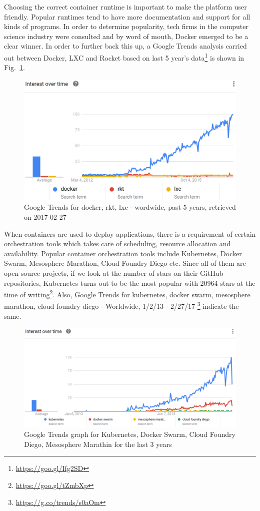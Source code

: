 \documentclass[DD]{iitmdiss}
\begin{document}
Choosing the correct container runtime is important to make the platform user friendly. Popular runtimes tend to have more documentation and support for all kinds of programs. In order to determine popularity, tech firms in the computer science industry were consulted and by word of mouth, Docker emerged to be a clear winner. In order to further back this up, a Google Trends analysis carried out between Docker, LXC and Rocket based on last 5 year's data\footnote{\url{https://goo.gl/Ifg2SD}} is shown in Fig.~\ref{fig:google_trends_docker_rkt_lxc}. 

\begin{figure}[h]
\centering
\includegraphics[width=0.9\linewidth]{img/google_trends_docker_rkt_lxc}
\caption[Google trends for Docker and others]{Google Trends for docker, rkt, lxc - wordwide, past 5 years, retrieved on 2017-02-27}
\label{fig:google_trends_docker_rkt_lxc}
\end{figure}

When containers are used to deploy applications, there is a requirement of certain orchestration tools which takes care of scheduling, resource allocation and availability. Popular container orchestration tools include Kubernetes, Docker Swarm, Mesosphere Marathon, Cloud Foundry Diego etc. Since all of them are open source projects, if we look at the number of stars on their GitHub repositories, Kubernetes turns out to be the most popular with 20964 stars at the time of writing\footnote{\url{https://goo.gl/tZmbXp}}. Also, Google Trends for kubernetes, docker swarm, mesosphere marathon, cloud foundry diego - Worldwide, 1/2/13 - 2/27/17 \footnote{\url{https://g.co/trends/s0aOm}} indicate the same.

\begin{figure}[h]
\centering
\includegraphics[width=0.9\linewidth]{img/k8s_swarm_mesosphere}
\caption[Google trends for Kubernetes and others]{Google Trends graph for Kubernetes, Docker Swarm, Cloud Foundry Diego, Mesosphere Marathin for the last 3 years}
\label{fig:k8s_swarm_mesosphere}
\end{figure}
\end{document}
